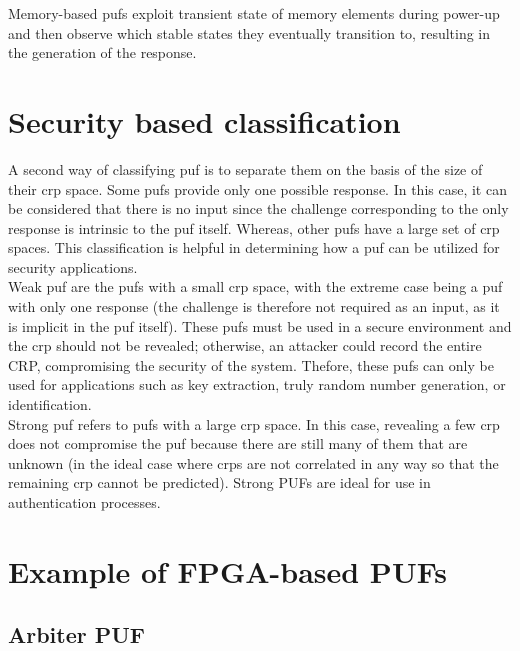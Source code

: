 Memory-based \acrshort{puf}s exploit transient state of memory elements during power-up and then observe which stable states they eventually transition to, resulting in the generation of the response.\\


\section{Security based classification}

A second way of classifying \acrshort{puf} is to separate them on the basis of the size of their \acrfull{crp} space. Some \acrshort{puf}s provide only one possible response. In this case, it can be considered that there is no input since the challenge corresponding to the only response is intrinsic to the \acrshort{puf} itself. Whereas, other \acrshort{puf}s have a large set of \acrfull{crp} spaces. This classification is helpful in determining how a \acrshort{puf} can be utilized for security applications.\\

Weak \acrshort{puf} are the \acrshort{puf}s with a small \acrshort{crp} space, with the extreme case being a \acrshort{puf} with only one response (the challenge is therefore not required as an input, as it is implicit in the \acrshort{puf} itself). These \acrshort{puf}s must be used in a secure environment and the \acrshort{crp} should not be revealed; otherwise, an attacker could record the entire CRP, compromising the security of the system. Thefore, these \acrshort{puf}s can only be used for applications such as key extraction, truly random number generation, or identification.\\

Strong \acrshort{puf} refers to \acrshort{puf}s with a large \acrshort{crp} space. In this case, revealing a few \acrshort{crp} does not compromise the \acrshort{puf} because there are still many of them that are unknown (in the ideal case where \acrshort{crp}s are not correlated in any way so that the remaining \acrshort{crp} cannot be predicted). Strong PUFs are ideal for use in authentication processes.


\section{Example of FPGA-based PUFs}


\subsection{Arbiter PUF}

